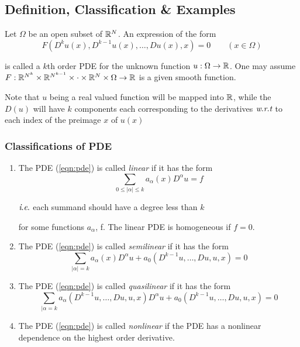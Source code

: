 \subsection{Definition,  Classification \& Examples}
\begin{definition}
    Let $\Omega$ be an open subset of $\mathbb R ^N$. An expression of the form  
        \begin{equation}
            F\left( D^{k} u(x), D^{k-1} u(x), \ldots , Du(x), x \right)=0 \qquad (x\in \Omega)
            \label{eqn:pde}
        \end{equation}

    is called a $k$th order PDE for the unknown function $u:\Omega \to \mathbb R$. One may assume $F: \mathbb R ^{N^k} \times \mathbb R^{N^{k-1}} \times \cdot \times \mathbb R ^N \times \Omega \to \mathbb R$ is a given smooth function.

    \begin{remark}
        Note that $u$ being a real valued function will be mapped into $\mathbb R$, while the $D(u)$ will have $k$ components each corresponding to the derivatives $\textit{w}.\textit{r}.\textit{t}$ to each index of the preimage $x$ of $u(x)$
    \end{remark}

\end{definition}



\subsubsection{Classifications of PDE}
\begin{enumerate}[label=(\roman*)]

    \item The PDE (\ref{eqn:pde}) is called \textit{linear} if it has the form $$\sum_{0\le |\alpha| \le k} a_{\alpha} (x) D^{\alpha} u =f$$ 
    \begin{flushright}
     $\textit{i}.\textit{e}.$ each summand should have a degree less than $k$
    \end{flushright}
	for some functions $a_{ \alpha }$, f. The linear PDE is homogeneous if $f=0$.

    \item The PDE (\ref{eqn:pde}) is called \textit{semilinear} if it has the form
        $$\sum_{|\alpha|=k} a_{\alpha}(x) D^{\alpha}u + a_0 \left( D^{k-1}u, \ldots , Du, u, x \right) =0$$

    \item The PDE (\ref{eqn:pde}) is called \textit{quasilinear} if it has the form 
        $$\sum_{|\alpha =k} a_{\alpha} (D^{k-1} u, \ldots , Du, u, x) D^{\alpha} u + a_0 \left( D^{k-1} u, \ldots , Du, u, x \right) = 0$$

    \item The PDE (\ref{eqn:pde}) is called \textit{nonlinear} if the PDE has a nonlinear dependence on the highest order derivative.

\end{enumerate}

